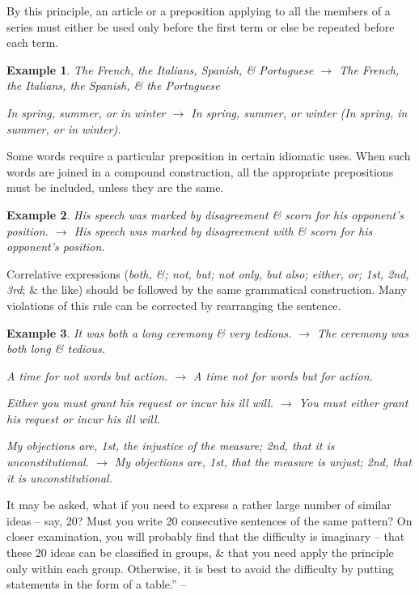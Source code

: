 \documentclass{article}
\newtheorem{example}{Example}
\begin{document}
By this principle, an article or a preposition applying to all the members of a series must either be used only before the first term or else be repeated before each term.
\begin{example}
	The French, the Italians, Spanish, \& Portuguese $\to$ The French, the Italians, the Spanish, \& the Portuguese
	
	In spring, summer, or in winter $\to$ In spring, summer, or winter (In spring, in summer, or in winter).
\end{example}
Some words require a particular preposition in certain idiomatic uses. When such words are joined in a compound construction, all the appropriate prepositions must be included, unless they are the same.
\begin{example}
	His speech was marked by disagreement \& scorn for his opponent's position. $\to$ His speech was marked by disagreement with \& scorn for his opponent's position.
\end{example}
Correlative expressions ({\it both, \&; not, but; not only, but also; either, or; 1st, 2nd, 3rd}; \& the like) should be followed by the same grammatical construction. Many violations of this rule can be corrected by rearranging the sentence.
\begin{example}
	It was both a long ceremony \& very tedious. $\to$ The ceremony was both long \& tedious.
	
	A time for not words but action. $\to$ A time not for words but for action.
	
	Either you must grant his request or incur his ill will. $\to$ You must either grant his request or incur his ill will.
	
	My objections are, 1st, the injustice of the measure; 2nd, that it is unconstitutional. $\to$ My objections are, 1st, that the measure is unjust; 2nd, that it is unconstitutional.
\end{example}
It may be asked, what if you need to express a rather large number of similar ideas -- say, 20? Must you write 20 consecutive sentences of the same pattern? On closer examination, you will probably find that the difficulty is imaginary -- that these 20 ideas can be classified in groups, \& that you need apply the principle only within each group. Otherwise, it is best to avoid the difficulty by putting statements in the form of a table.'' -- \cite[pp. 41--42]{Strunk_White_element_style}

\end{document}
